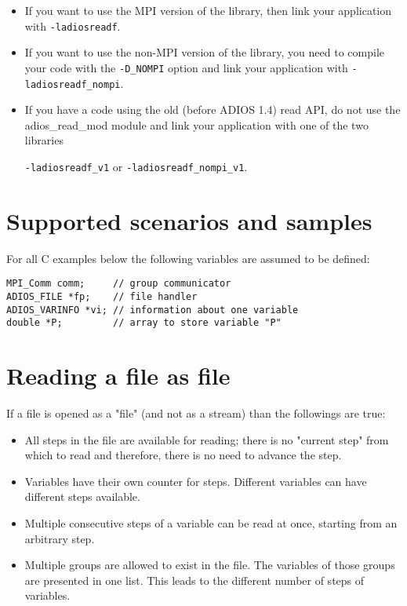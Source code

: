 \begin{itemize}
\item If you want to use the MPI version of the library, then link your  application with \verb+-ladiosreadf+.

\item If you want to use the non-MPI version of the library, you need to compile your 
code with the \verb+-D_NOMPI+ option and link your application with \verb+-ladiosreadf_nompi+.

\item If you have a code using the old (before ADIOS 1.4) read API,  
do not use the adios\_read\_mod module and link your application 
with one of the two libraries 

\verb+-ladiosreadf_v1+ or \verb+-ladiosreadf_nompi_v1+.

\end{itemize}




\section{Supported scenarios and samples}

For all C examples below the following variables are assumed to be defined:
\begin{lstlisting}[frame=none]
MPI_Comm comm;     // group communicator
ADIOS_FILE *fp;    // file handler
ADIOS_VARINFO *vi; // information about one variable
double *P;         // array to store variable "P"
\end{lstlisting}


\section{Reading a file as file}
If a file is opened as a "file" (and not as a stream) than the followings are true:

  \begin{itemize}
  \item All steps in the file are available for reading; there is no "current step" from which to read and therefore, there is no need to advance the step.
  \item Variables have their own counter for steps. Different variables can have different steps available.
  \item Multiple consecutive steps of a variable can be read at once, starting from an arbitrary step.
  \item Multiple groups are allowed to exist in the file. The variables of those groups are presented in one list. This leads to the different number of steps of variables.
  \end{itemize}


